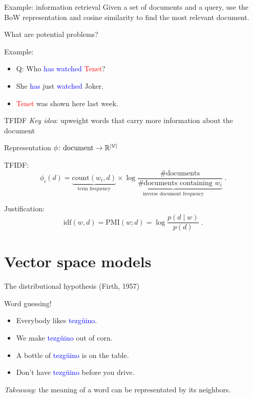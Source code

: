 \documentclass[usenames,dvipsnames,notes]{beamer}
\begin{document}
\begin{frame}
    {Example: information retrieval}
    Given a set of documents and a query,
    use the BoW representation and cosine similarity
    to find the most relevant document.

    What are potential problems?
    
    \vspace{5em}

    \pause
    Example:\\
    \begin{itemize}
        \item[] Q: Who \textcolor{blue}{has watched} \textcolor{red}{Tenet}?
        \item[] She \textcolor{blue}{has} just \textcolor{blue}{watched} Joker.
        \item[] \textcolor{red}{Tenet} was shown here last week.
    \end{itemize}
\end{frame}

\begin{frame}
    {TFIDF}
    \emph{Key idea}: upweight words that carry more information about the document

    Representation $\phi\colon \text{document} \rightarrow \mathbb{R}^{|\mathcal{V}|}$

    TFIDF:\\
    $$
    \phi_i(d) = \underbrace{\text{count}(w_i, d)}_{\text{term frequency}} \times
    \underbrace{\log \frac{\text{\# documents}}{\text{\# documents containing $w_i$}}}_{\text{inverse document frequency}}
    \;.
    $$

    Justification:\\
    $$
    \text{idf}(w, d) = \text{PMI}(w; d) = \log\frac{p(d\mid w)}{p(d)} \;.
    $$
\end{frame}

\section{Vector space models}

\begin{frame}
    {The distributional hypothesis}
     (Firth, 1957)

    Word guessing!\\
    \begin{itemize}[<+->]
        \item[] Everybody likes \textcolor{blue}{tezg\"uino}.
        \item[] We make \textcolor{blue}{tezg\"uino} out of corn.
        \item[] A bottle of \textcolor{blue}{tezg\"uino} is on the table.
        \item[] Don't have \textcolor{blue}{tezg\"uino} before you drive.
    \end{itemize}

    \emph{Takeaway}: the meaning of a word can be representated by its neighbors.
\end{frame}
\end{document}
